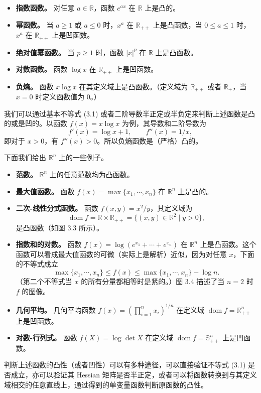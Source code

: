 \documentclass[UTF8, 12pt, fontset=fandol, oneside]{ctexart}
\DeclareMathOperator{\dom}{dom}
\begin{document}
\begin{itemize}
\item \textbf{指数函数。} 对任意 $a\in\mathbb{R}$，函数 $e^{ax}$ 在 $\mathbb{R}$ 上是凸的。
\item \textbf{幂函数。} 当 $a\geq1$ 或 $a\leq0$ 时，$x^a$ 在 $\mathbb{R}_{++}$ 上是凸函数，当 $0\leq a\leq1$ 时，$x^a$ 在 $\mathbb{R}_{++}$ 上是凹函数。
\item \textbf{绝对值幂函数。} 当 $p\geq1$ 时，函数 $|x|^p$ 在 $\mathbb{R}$ 上是凸函数。
\item \textbf{对数函数。} 函数 $\log x$ 在 $\mathbb{R}_{++}$ 上是凹函数。
\item \textbf{负熵。} 函数 $x\log x$ 在其定义域上是凸函数。（定义域为 $\mathbb{R}_{++}$ 或者 $\mathbb{R}_+$，当 $x=0$ 时定义函数值为 0。）
\end{itemize}

我们可以通过基本不等式 (3.1) 或者二阶导数半正定或半负定来判断上述函数是凸的或是凹的。以函数 $f(x)=x\log x$ 为例，其导数和二阶导数为
\[
f'(x)=\log x+1,\qquad f''(x)=1/x,
\]
即对于 $x>0$，有 $f''(x)>0$。所以负熵函数是（严格）凸的。

下面我们给出 $\mathbb{R}^n$ 上的一些例子。

\begin{itemize}
\item \textbf{范数。} $\mathbb{R}^n$ 上的任意范数均为凸函数。
\item \textbf{最大值函数。} 函数 $f(x)=\max\{x_1,\cdots,x_n\}$ 在 $\mathbb{R}^n$ 上是凸的。
\item \textbf{二次-线性分式函数。} 函数 $f(x,y)=x^2/y$，其定义域为
\[
\dom f=\mathbb{R}\times\mathbb{R}_{++}=\{(x,y)\in\mathbb{R}^2\mid y>0\},
\]
是凸函数（如图 3.3 所示）。
\item \textbf{指数和的对数。} 函数 $f(x)=\log(e^{x_1}+\cdots+e^{x_n})$ 在 $\mathbb{R}^n$ 上是凸函数。这个函数可以看成最大值函数的可微（实际上是解析）近似，因为对任意 $x$，下面的不等式成立
\[
\max\{x_1,\cdots,x_n\}\leq f(x)\leq \max\{x_1,\cdots,x_n\}+\log n.
\]
（第二个不等式当 $x$ 的所有分量都相等时是紧的。）图 3.4 描述了当 $n=2$ 时 $f$ 的图像。
\item \textbf{几何平均。} 几何平均函数 $f(x)=\left(\prod_{i=1}^n x_i\right)^{1/n}$ 在定义域 $\dom f=\mathbb{R}_{++}^n$ 上是凹函数。
\item \textbf{对数-行列式。} 函数 $f(X)=\log\det X$ 在定义域 $\dom f=\mathbb{S}_{++}^n$ 上是凹函数。
\end{itemize}

判断上述函数的凸性（或者凹性）可以有多种途径，可以直接验证不等式 (3.1) 是否成立，亦可以验证其 Hessian 矩阵是否半正定，或者可以将函数转换到与其定义域相交的任意直线上，通过得到的单变量函数判断原函数的凸性。
\end{document}

